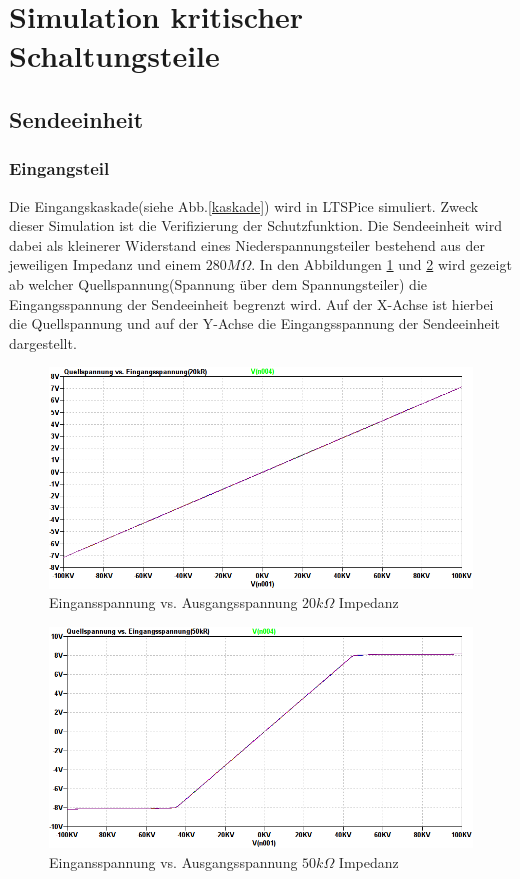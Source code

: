 \section{Simulation kritischer Schaltungsteile}
\subsection{Sendeeinheit}
\subsubsection{Eingangsteil}
Die Eingangskaskade(siehe Abb.\ref{kaskade}) wird in LTSPice simuliert. Zweck dieser Simulation ist die Verifizierung der Schutzfunktion. Die Sendeeinheit wird dabei als kleinerer Widerstand eines Niederspannungsteiler bestehend aus der jeweiligen Impedanz und einem $280M\Omega$. In den Abbildungen \ref{impedanz20k} und \ref{impedanz50k} wird gezeigt ab welcher Quellspannung(Spannung über dem Spannungsteiler) die Eingangsspannung der Sendeeinheit begrenzt wird. Auf der X-Achse ist hierbei die Quellspannung und auf der Y-Achse die Eingangsspannung der Sendeeinheit dargestellt. 
\begin{figure}[H]
\centering
 \includegraphics[scale=0.47]{gfx/simTx/Impedance20k.png}
 \caption{Eingansspannung vs. Ausgangsspannung $20k\Omega$ Impedanz}
	\label{impedanz20k} 
\end{figure}


\begin{figure}[H]
\centering
\includegraphics[scale=0.47]{gfx/simTx/Impedance50k.png}
 \caption{Eingansspannung vs. Ausgangsspannung $50k\Omega$ Impedanz}
	\label{impedanz50k} 
\end{figure}


